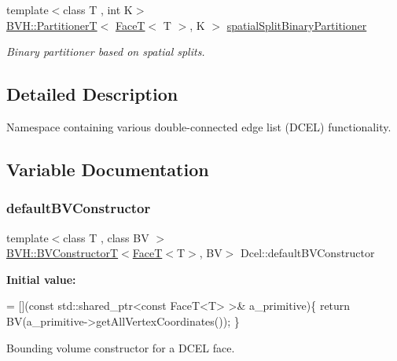 \begin{DoxyCompactItemize}
{\footnotesize template$<$class T , int K$>$ }\\\hyperlink{namespaceBVH_a7c33d54da9893d506709b2ca96b76f55}{B\+V\+H\+::\+PartitionerT}$<$ \hyperlink{classDcel_1_1FaceT}{FaceT}$<$ T $>$, K $>$ \hyperlink{namespaceDcel_a08217ffcd4cfc6f58a3b0b3f780fc611}{spatial\+Split\+Binary\+Partitioner}
\begin{DoxyCompactList}\small\item\em Binary partitioner based on spatial splits. \end{DoxyCompactList}\end{DoxyCompactItemize}


\subsection{Detailed Description}
Namespace containing various double-\/connected edge list (D\+C\+EL) functionality. 

\subsection{Variable Documentation}
\mbox{\label{namespaceDcel_a628449c42ce3f2784ca018f2a3c88a11}} 
\subsubsection{\texorpdfstring{default\+B\+V\+Constructor}{defaultBVConstructor}}
{\footnotesize\ttfamily template$<$class T , class BV $>$ \\
\hyperlink{namespaceBVH_a245702d7eff40cdaedb5dff68c25a88a}{B\+V\+H\+::\+B\+V\+ConstructorT}$<$\hyperlink{classDcel_1_1FaceT}{FaceT}$<$T$>$, BV$>$ Dcel\+::default\+B\+V\+Constructor}

{\bfseries Initial value\+:}
\begin{DoxyCode}
= [](\textcolor{keyword}{const} std::shared\_ptr<const FaceT<T> >& a\_primitive)\{
    \textcolor{keywordflow}{return} BV(a\_primitive->getAllVertexCoordinates());
  \}
\end{DoxyCode}


Bounding volume constructor for a D\+C\+EL face. 

